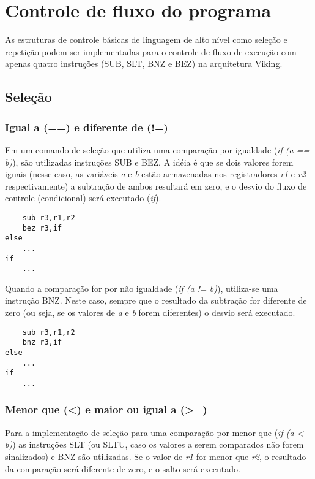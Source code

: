 \documentclass{extreport}
\begin{document}
\section{Controle de fluxo do programa}

As estruturas de controle básicas de linguagem de alto nível como seleção e repetição podem ser implementadas para o controle de fluxo de execução com apenas quatro instruções (SUB, SLT, BNZ e BEZ) na arquitetura Viking.

\subsection{Seleção}

\subsubsection{Igual a (==) e diferente de (!=)}

Em um comando de seleção que utiliza uma comparação por igualdade (\textit{if (a == b)}), são utilizadas instruções SUB e BEZ. A idéia é que se dois valores forem iguais (nesse caso, as variáveis \textit{a} e \textit{b} estão armazenadas nos registradores \textit{r1} e \textit{r2} respectivamente) a subtração de ambos resultará em zero, e o desvio do fluxo de controle (condicional) será executado (\textit{if}).

\begin{verbatim}
    sub r3,r1,r2
    bez r3,if
else
    ...
if
    ...
\end{verbatim}

Quando a comparação for por não igualdade (\textit{if (a != b)}), utiliza-se uma instrução BNZ. Neste caso, sempre que o resultado da subtração for diferente de zero (ou seja, se os valores de \textit{a} e \textit{b} forem diferentes) o desvio será executado.

\begin{verbatim}
    sub r3,r1,r2
    bnz r3,if
else
    ...
if
    ...
\end{verbatim}

\subsubsection{Menor que (<) e maior ou igual a (>=)}

Para a implementação de seleção para uma comparação por menor que (\textit{if (a < b)}) as instruções SLT (ou SLTU, caso os valores a serem comparados não forem sinalizados) e BNZ são utilizadas. Se o valor de \textit{r1} for menor que \textit{r2}, o resultado da comparação será diferente de zero, e o salto será executado.
\end{document}
